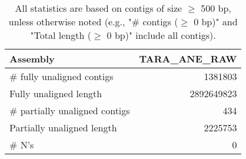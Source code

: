 \documentclass[12pt,a4paper]{article}
\begin{document}
\begin{table}[ht]
\begin{center}
\caption{All statistics are based on contigs of size $\geq$ 500 bp, unless otherwise noted (e.g., "\# contigs ($\geq$ 0 bp)" and "Total length ($\geq$ 0 bp)" include all contigs).}
\begin{tabular}{|l*{1}{|r}|}
\hline
Assembly & TARA\_ANE\_RAW \\ \hline
\# fully unaligned contigs & 1381803 \\ \hline
Fully unaligned length & 2892649823 \\ \hline
\# partially unaligned contigs & 434 \\ \hline
Partially unaligned length & 2225753 \\ \hline
\# N's & 0 \\ \hline
\end{tabular}
\end{center}
\end{table}
\end{document}
